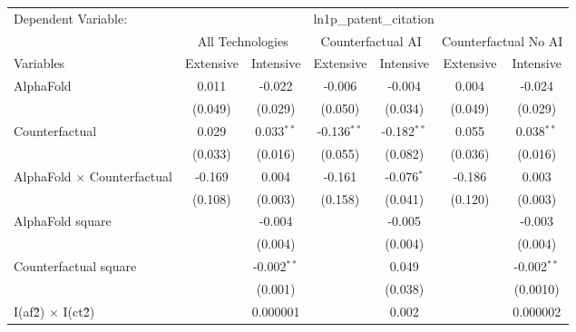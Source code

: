 \begingroup
\centering
\begin{tabular}{lcccccc}
   \tabularnewline \midrule \midrule
   Dependent Variable: & \multicolumn{6}{c}{ln1p\_patent\_citation}\\
 & \multicolumn{2}{c}{All Technologies} & \multicolumn{2}{c}{Counterfactual AI} & \multicolumn{2}{c}{Counterfactual No AI} \\
\cmidrule(lr){1-1}\cmidrule(lr){2-3} \cmidrule(lr){4-5} \cmidrule(lr){6-7}
Variables & \multicolumn{1}{c}{Extensive} & \multicolumn{1}{c}{Intensive} & \multicolumn{1}{c}{Extensive} & \multicolumn{1}{c}{Intensive} & \multicolumn{1}{c}{Extensive} & \multicolumn{1}{c}{Intensive} \\
\cmidrule(lr){1-1}\cmidrule(lr){2-2} \cmidrule(lr){3-3} \cmidrule(lr){4-4} \cmidrule(lr){5-5} \cmidrule(lr){6-6} \cmidrule(lr){7-7}
   AlphaFold                          & 0.011   & -0.022        & -0.006        & -0.004        & 0.004   & -0.024\\   
                                      & (0.049) & (0.029)       & (0.050)       & (0.034)       & (0.049) & (0.029)\\   
   Counterfactual                     & 0.029   & 0.033$^{**}$  & -0.136$^{**}$ & -0.182$^{**}$ & 0.055   & 0.038$^{**}$\\   
                                      & (0.033) & (0.016)       & (0.055)       & (0.082)       & (0.036) & (0.016)\\   
   AlphaFold $\times$ Counterfactual  & -0.169  & 0.004         & -0.161        & -0.076$^{*}$  & -0.186  & 0.003\\   
                                      & (0.108) & (0.003)       & (0.158)       & (0.041)       & (0.120) & (0.003)\\   
   AlphaFold square                   &         & -0.004        &               & -0.005        &         & -0.003\\   
                                      &         & (0.004)       &               & (0.004)       &         & (0.004)\\   
   Counterfactual square              &         & -0.002$^{**}$ &               & 0.049         &         & -0.002$^{**}$\\   
                                      &         & (0.001)       &               & (0.038)       &         & (0.0010)\\   
   I(af\^2) $\times$ I(ct\^2)         &         & 0.000001      &               & 0.002         &         & 0.000002\\   

\end{tabular}
